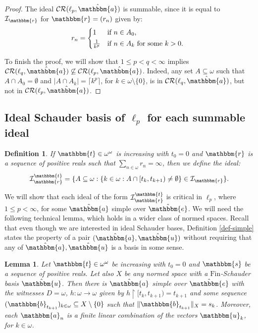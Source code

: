 \documentclass{amsart}
\newcommand{\I}{\mathcal{I}}
\newcommand{\Fin}{\mathrm{Fin}}
\newcommand{\CR}{\mathcal{CR}}
\newcommand{\w}{\mathbbm}
\newtheorem{definition}[theorem]{Definition}
\newtheorem{lemma}[theorem]{Lemma}
\begin{document}
\begin{proof}
The ideal $\CR(\ell_p,\hat{\w{a}})$ is summable, since it is equal to $\I_{\w{r}}$ for $\w{r}=(r_n)$ given by:
\[
    r_n =
    \begin{cases*}
    1    & if $n\in A_0$,\\
    \frac{1}{k^p} & if $n\in A_k$ for some $k>0$.
    \end{cases*}
  \]

To finish the proof, we will show that $1\leq p<q<\infty$ implies $\CR(\ell_q,\hat{\w{a}})\not\subseteq\CR(\ell_p,\hat{\w{a}})$. Indeed, any set $A\subseteq\omega$ such that $A\cap A_0=\emptyset$ and $|A\cap A_k|=\lceil k^p\rceil$, for $k\in\omega\setminus\{0\}$, is in $\CR(\ell_q,\hat{\w{a}})$, but not in $\CR(\ell_p,\hat{\w{a}})$.
\end{proof}



\subsection{Ideal Schauder basis of \texorpdfstring{$\ell_p$}{l } for each summable ideal}

\begin{definition}
If $\w{t}\in\omega^\omega$ is increasing with $t_0=0$ and $\w{r}$ is a sequence of positive reals such that $\sum_{n\in\omega}r_n=\infty$, then we define the ideal:
\[\I_{\w{r}}^\w{t}=\{A\subseteq\omega: \{k\in\omega: A\cap [t_k,t_{k+1})\neq\emptyset\}\in\I_{\w{r}}\}.
\]
\end{definition}

We will show that each ideal of the form $\I_{\w{r}}^\w{t}$ is critical in $\ell_p$, where $1\leq p<\infty$, for some $\hat{\w{a}}$ simple over $\hat{\w{e}}$. We will need the following technical lemma, which holds in a wider class of normed spaces. Recall that even though we are interested in ideal Schauder bases, Definition \ref{def-simple} states the property of a pair $(\hat{\w{a}},\hat{\w{u}})$ without requiring that any of $\hat{\w{a}},\hat{\w{u}}$ is a basis in some sense. 

\begin{lemma}
\label{lem:any_sequence}
Let $\w{t}\in\omega^\omega$ be increasing with $t_0=0$ and $\w{s}$ be a sequence of positive reals. Let also $X$ be any normed space with a $\Fin$-Schauder basis $\hat{\w{u}}$. Then there is $\hat{\w{a}}$ simple over $\hat{\w{e}}$ with the witnesses $D=\omega$, $h:\omega\to\omega$ given by $h\restriction[t_k,t_{k+1})=t_{k+1}$ and some sequence $(\w{b}_{t_{k+1}})_{k\in\omega}\subseteq X\setminus\{0\}$ such that $\|\w{b}_{t_{k+1}}\|_X=s_k$. Moreover, each $\w{a}_n$ is a finite linear combination of the vectors $\w{u}_k$, for $k\in\omega$.
\end{lemma}
\end{document}
